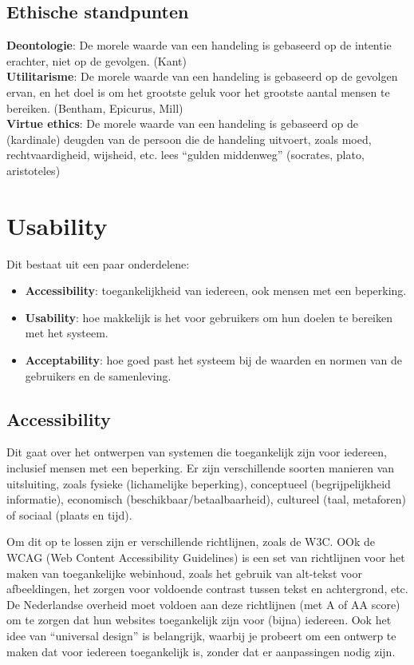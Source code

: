 \documentclass[nonacm, sigconf, balance=true]{acmart}
\begin{document}
    \subsection{Ethische standpunten}
    \textbf{Deontologie}: De morele waarde van een handeling is gebaseerd op de intentie erachter, niet op de gevolgen. (Kant)\\
    \textbf{Utilitarisme}: De morele waarde van een handeling is gebaseerd op de gevolgen ervan, en het doel is om het grootste geluk voor het grootste aantal mensen te bereiken. (Bentham, Epicurus, Mill)\\
    \textbf{Virtue ethics}: De morele waarde van een handeling is gebaseerd op de (kardinale) deugden van de persoon die de handeling uitvoert, zoals moed, rechtvaardigheid, wijsheid, etc. lees ``gulden middenweg'' (socrates, plato, aristoteles)\\


    \section{Usability}
    Dit bestaat uit een paar onderdelene:

    \begin{itemize}
        \item \textbf{Accessibility}: toegankelijkheid van iedereen, ook mensen met een beperking.
        \item \textbf{Usability}: hoe makkelijk is het voor gebruikers om hun doelen te bereiken met het systeem.
        \item \textbf{Acceptability}: hoe goed past het systeem bij de waarden en normen van de gebruikers en de samenleving.
    \end{itemize}

    \subsection{Accessibility}
    Dit gaat over het ontwerpen van systemen die toegankelijk zijn voor iedereen, inclusief mensen met een beperking.
    Er zijn verschillende soorten manieren van uitsluiting, zoals fysieke (lichamelijke beperking), conceptueel (begrijpelijkheid informatie), economisch (beschikbaar/betaalbaarheid), cultureel (taal, metaforen) of sociaal (plaats en tijd).

    Om dit op te lossen zijn er verschillende richtlijnen, zoals de W3C.
    OOk de WCAG (Web Content Accessibility Guidelines) is een set van richtlijnen voor het maken van toegankelijke webinhoud, zoals het gebruik van alt-tekst voor afbeeldingen, het zorgen voor voldoende contrast tussen tekst en achtergrond, etc.
    De Nederlandse overheid moet voldoen aan deze richtlijnen (met A of AA score) om te zorgen dat hun websites toegankelijk zijn voor (bijna) iedereen.
    Ook het idee van ``universal design'' is belangrijk, waarbij je probeert om een ontwerp te maken dat voor iedereen toegankelijk is, zonder dat er aanpassingen nodig zijn.
\end{document}
